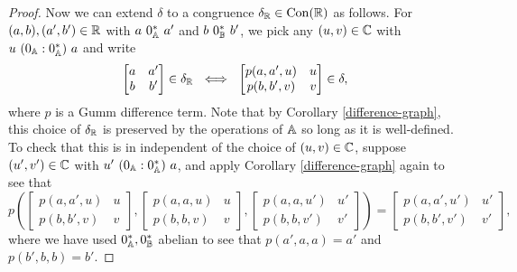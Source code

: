 \documentclass[letterpaper,11pt]{article}
\DeclareMathOperator{\Con}{Con}
\begin{document}
\begin{proof}
Now we can extend $\delta$ to a congruence $\delta_\RR \in \Con(\RR)$ as follows. For $(a,b), (a',b') \in \mathbb{R}$ with $a\ 0_{\mathbb{A}}^*\ a'$ and $b\ 0_{\mathbb{B}}^*\ b'$, we pick any $(u,v) \in \mathbb{C}$ with $u\ (0_{\mathbb{A}}:0_{\mathbb{A}}^*)\ a$ and write
\[
\begin{bmatrix} a & a'\\ b & b'\end{bmatrix} \in \delta_{\mathbb{R}}\ \iff\ \begin{bmatrix} p(a,a',u) & u\\ p(b,b',v) & v\end{bmatrix} \in \delta,
\]
where $p$ is a Gumm difference term. Note that by Corollary \ref{difference-graph}, this choice of $\delta_{\mathbb{R}}$ is preserved by the operations of $\mathbb{A}$ so long as it is well-defined. To check that this is in independent of the choice of $(u,v) \in \mathbb{C}$, suppose $(u',v') \in \mathbb{C}$ with $u'\ (0_{\mathbb{A}}:0_{\mathbb{A}}^*)\ a$, and apply Corollary \ref{difference-graph} again to see that
\[
p\left(\begin{bmatrix} p(a,a',u) & u\\ p(b,b',v) & v\end{bmatrix}, \begin{bmatrix} p(a,a,u) & u\\ p(b,b,v) & v\end{bmatrix}, \begin{bmatrix} p(a,a,u') & u'\\ p(b,b,v') & v'\end{bmatrix}\right) = \begin{bmatrix} p(a,a',u') & u'\\ p(b,b',v') & v'\end{bmatrix},
\]
where we have used $0_{\mathbb{A}}^*, 0_{\mathbb{B}}^*$ abelian to see that $p(a',a,a) = a'$ and $p(b',b,b) = b'$.


\end{proof}
\end{document}
